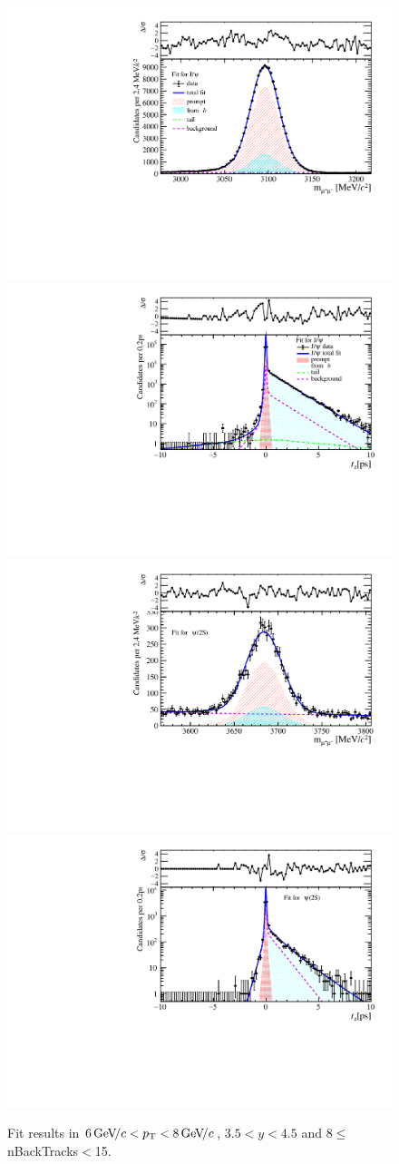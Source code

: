 \begin{figure}[H]
\begin{center}
\includegraphics[width=0.47\linewidth]{pdf/Jpsi/drawmassB/n2y3pt4.pdf}
\includegraphics[width=0.47\linewidth]{pdf/Jpsi/2DFitB/n2y3pt4.pdf}
\vspace*{-0.5cm}
\includegraphics[width=0.47\linewidth]{pdf/Psi2S/drawmassB/n2y3pt4.pdf}
\includegraphics[width=0.47\linewidth]{pdf/Psi2S/2DFitB/n2y3pt4.pdf}
\vspace*{-0.5cm}
\end{center}
\caption{Fit results in $6\text{\,Ge\kern -0.1em V\!/}c<p_{\mathrm{T}}<8\text{\,Ge\kern -0.1em V\!/}c$, $3.5<y<4.5$ and 8$\leq$nBackTracks$<$15.}
\label{Fitn2y3pt4}
\end{figure}
